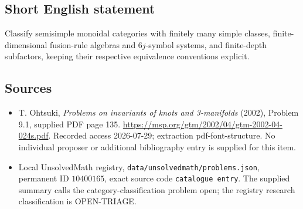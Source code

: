 \documentclass[11pt]{article}
\begin{document}
\subsection{Short English statement}
Classify semisimple monoidal categories with finitely many simple classes, finite-dimensional fusion-rule algebras and \(6j\)-symbol systems, and finite-depth subfactors, keeping their respective equivalence conventions explicit.
\subsection{Sources}
\begin{itemize}
\item T. Ohtsuki, \emph{Problems on invariants of knots and 3-manifolds} (2002), Problem 9.1, supplied PDF page 135. \url{https://msp.org/gtm/2002/04/gtm-2002-04-024s.pdf}. Recorded access 2026-07-29; extraction pdf-font-structure. No individual proposer or additional bibliography entry is supplied for this item.
\item Local UnsolvedMath registry, \texttt{data/unsolvedmath/problems.json}, permanent ID \(10400165\), exact source code \texttt{catalogue entry}. The supplied summary calls the category-classification problem open; the registry research classification is OPEN-TRIAGE.
\end{itemize}
\end{document}

